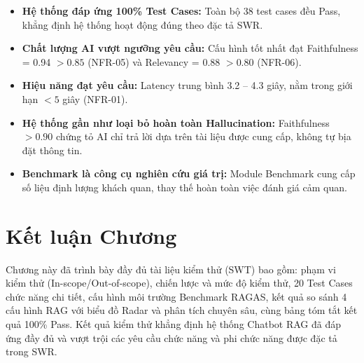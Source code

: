 \begin{itemize}[itemsep=4pt]
  \item \textbf{Hệ thống đáp ứng 100\% Test Cases:} Toàn bộ 38 test cases đều Pass, khẳng định hệ thống hoạt động đúng theo đặc tả SWR.
  \item \textbf{Chất lượng AI vượt ngưỡng yêu cầu:} Cấu hình tốt nhất đạt Faithfulness = 0.94 $> 0.85$ (NFR-05) và Relevancy = 0.88 $> 0.80$ (NFR-06).
  \item \textbf{Hiệu năng đạt yêu cầu:} Latency trung bình 3.2 -- 4.3 giây, nằm trong giới hạn $< 5$ giây (NFR-01).
  \item \textbf{Hệ thống gần như loại bỏ hoàn toàn Hallucination:} Faithfulness $> 0.90$ chứng tỏ AI chỉ trả lời dựa trên tài liệu được cung cấp, không tự bịa đặt thông tin.
  \item \textbf{Benchmark là công cụ nghiên cứu giá trị:} Module Benchmark cung cấp số liệu định lượng khách quan, thay thế hoàn toàn việc đánh giá cảm quan.
\end{itemize}

\section{Kết luận Chương}

Chương này đã trình bày đầy đủ tài liệu kiểm thử (SWT) bao gồm: phạm vi kiểm thử (In-scope/Out-of-scope), chiến lược và mức độ kiểm thử, 20 Test Cases chức năng chi tiết, cấu hình môi trường Benchmark RAGAS, kết quả so sánh 4 cấu hình RAG với biểu đồ Radar và phân tích chuyên sâu, cùng bảng tóm tắt kết quả 100\% Pass. Kết quả kiểm thử khẳng định hệ thống Chatbot RAG đã đáp ứng đầy đủ và vượt trội các yêu cầu chức năng và phi chức năng được đặc tả trong SWR.
